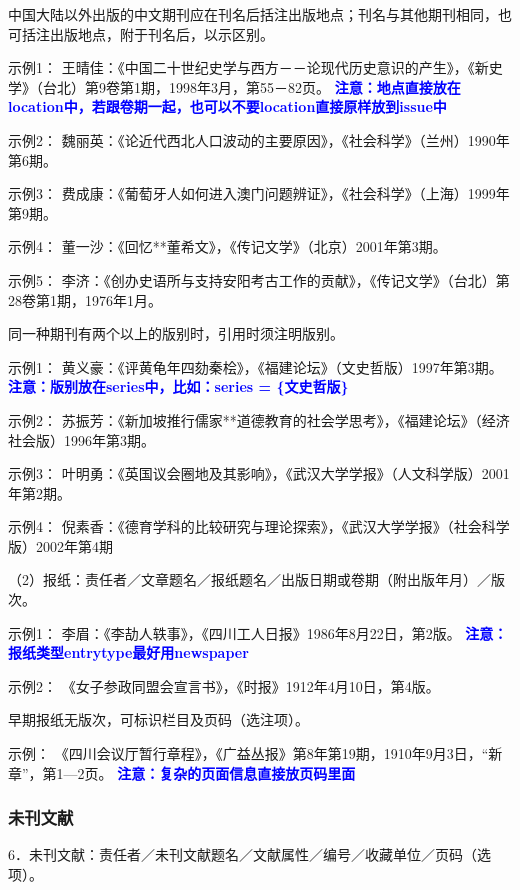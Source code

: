 \documentclass{article}
\newcommand{\qd}[1]{\textbf{\textcolor{blue}{#1}}}
\begin{document}
中国大陆以外出版的中文期刊应在刊名后括注出版地点；刊名与其他期刊相同，也可括注出版地点，附于刊名后，以示区别。

示例1：
王晴佳：《中国二十世纪史学与西方－－论现代历史意识的产生》，《新史学》（台北）第9卷第1期，1998年3月，第55－82页。
\qd{注意：地点直接放在location中，若跟卷期一起，也可以不要location直接原样放到issue中}

示例2：
魏丽英：《论近代西北人口波动的主要原因》，《社会科学》（兰州）1990年第6期。

示例3：
费成康：《葡萄牙人如何进入澳门问题辨证》，《社会科学》（上海）1999年第9期。

示例4：
董一沙：《回忆**董希文》，《传记文学》（北京）2001年第3期。

示例5：
李济：《创办史语所与支持安阳考古工作的贡献》，《传记文学》（台北）第28卷第1期，1976年1月。


同一种期刊有两个以上的版别时，引用时须注明版别。

示例1：
黄义豪：《评黄龟年四劾秦桧》，《福建论坛》（文史哲版）1997年第3期。
\qd{注意：版别放在series中，比如：series = \{文史哲版\}}

示例2：
苏振芳：《新加坡推行儒家**道德教育的社会学思考》，《福建论坛》（经济社会版）1996年第3期。

示例3：
叶明勇：《英国议会圈地及其影响》，《武汉大学学报》（人文科学版）2001年第2期。

示例4：
倪素香：《德育学科的比较研究与理论探索》，《武汉大学学报》（社会科学版）2002年第4期

（2）报纸：责任者／文章题名／报纸题名／出版日期或卷期（附出版年月）／版次。

示例1：
李眉：《李劼人轶事》，《四川工人日报》1986年8月22日，第2版。
\qd{注意：报纸类型entrytype最好用newspaper}

示例2：
《女子参政同盟会宣言书》，《时报》1912年4月10日，第4版。

早期报纸无版次，可标识栏目及页码（选注项）。

示例：
《四川会议厅暂行章程》，《广益丛报》第8年第19期，1910年9月3日，“新章”，第1—2页。
\qd{注意：复杂的页面信息直接放页码里面}



\subsubsection{未刊文献}
6．未刊文献：责任者／未刊文献题名／文献属性／编号／收藏单位／页码（选项）。
\end{document}
